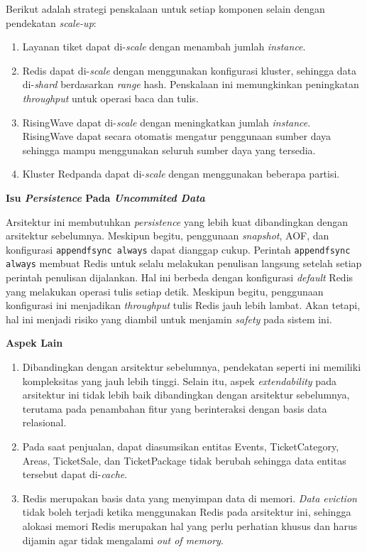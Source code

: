 Berikut adalah strategi penskalaan untuk setiap komponen selain dengan pendekatan \textit{scale-up}:

\begin{enumerate}
    \item Layanan tiket dapat di-\textit{scale} dengan menambah jumlah \textit{instance}.
    \item Redis dapat di-\textit{scale} dengan menggunakan konfigurasi kluster, sehingga data di-\textit{shard} berdasarkan \textit{range} hash. Penskalaan ini memungkinkan peningkatan \textit{throughput} untuk operasi baca dan tulis.
    \item  RisingWave dapat di-\textit{scale} dengan meningkatkan jumlah \textit{instance}. RisingWave dapat secara otomatis mengatur penggunaan sumber daya sehingga mampu menggunakan seluruh sumber daya yang tersedia.
    \item Kluster Redpanda dapat di-\textit{scale} dengan menggunakan beberapa partisi.
\end{enumerate}

\textbf{Isu \textit{Persistence} Pada \textit{Uncommited Data}}

Arsitektur ini membutuhkan \textit{persistence} yang lebih kuat dibandingkan dengan arsitektur sebelumnya. Meskipun begitu, penggunaan \textit{snapshot}, AOF, dan konfigurasi \texttt{appendfsync always} dapat dianggap cukup. Perintah \texttt{appendfsync always} membuat Redis untuk selalu melakukan penulisan langsung setelah setiap perintah penulisan dijalankan. Hal ini berbeda dengan konfigurasi \textit{default} Redis yang melakukan operasi tulis setiap detik. Meskipun begitu, penggunaan konfigurasi ini menjadikan \textit{throughput} tulis Redis jauh lebih lambat. Akan tetapi, hal ini menjadi risiko yang diambil untuk menjamin \textit{safety} pada sistem ini.

\textbf{Aspek Lain}

\begin{enumerate}
    \item Dibandingkan dengan arsitektur sebelumnya, pendekatan seperti ini memiliki kompleksitas yang jauh lebih tinggi. Selain itu, aspek \textit{extendability} pada arsitektur ini tidak lebih baik dibandingkan dengan arsitektur sebelumnya, terutama pada penambahan fitur yang berinteraksi dengan basis data relasional.
    \item Pada saat penjualan, dapat diasumsikan entitas Events, TicketCategory, Areas, TicketSale, dan TicketPackage tidak berubah sehingga data entitas tersebut dapat di-\textit{cache}.
    \item Redis merupakan basis data yang menyimpan data di memori. \textit{Data eviction} tidak boleh terjadi ketika menggunakan Redis pada arsitektur ini, sehingga alokasi memori Redis merupakan hal yang perlu perhatian khusus dan harus dijamin agar tidak mengalami \textit{out of memory}.
\end{enumerate}

